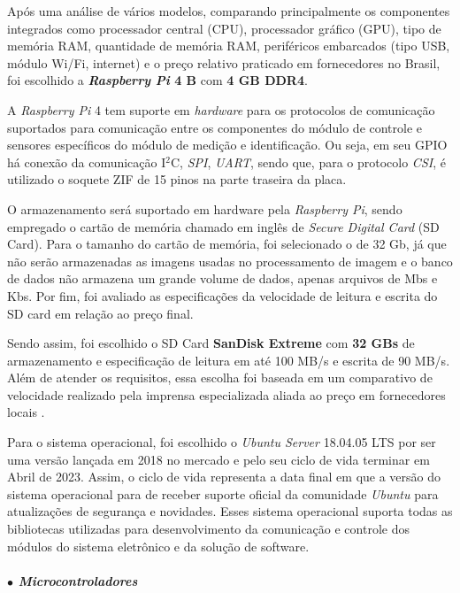    Após uma análise de vários modelos, comparando principalmente os componentes integrados como processador central (CPU), processador gráfico (GPU), tipo de memória RAM, quantidade de memória RAM, periféricos embarcados (tipo USB, módulo Wi/Fi, internet) e o preço relativo praticado em fornecedores no Brasil, foi escolhido a \textbf{\textit{Raspberry Pi }4 B} com \textbf{4 GB DDR4}. 
    
    A \textit{Raspberry Pi} 4 tem suporte em \textit{hardware} para os protocolos de comunicação suportados para comunicação entre os componentes do módulo de controle e sensores específicos do módulo de medição e identificação. Ou seja, em seu GPIO há conexão da comunicação I$^2$C, \textit{SPI}, \textit{UART}, sendo que, para o protocolo \textit{CSI}, é utilizado o soquete ZIF de 15 pinos na parte traseira da placa. 
    
    O armazenamento será suportado em hardware pela \textit{Raspberry Pi}, sendo empregado o cartão de memória chamado em inglês de \textit{Secure Digital Card} (SD Card). Para o tamanho do cartão de memória, foi selecionado o de 32 Gb, já que não serão  armazenadas as imagens usadas no processamento de imagem e o banco de dados não armazena um grande volume de dados, apenas arquivos de Mbs e Kbs. Por fim, foi avaliado as especificações da velocidade de leitura e escrita do SD card em relação ao preço final. 
    
    Sendo assim, foi escolhido o SD Card \textbf{SanDisk Extreme} com \textbf{32 GBs} de armazenamento e especificação de leitura em até 100 MB/s e escrita de 90 MB/s. Além de atender os requisitos, essa escolha foi baseada em um comparativo de velocidade realizado pela imprensa especializada aliada ao preço em fornecedores locais \cite{sdcard_benchmark}. 
    
    Para o sistema operacional, foi escolhido o \textit{Ubuntu Server} 18.04.05 LTS por ser uma versão lançada em 2018 no mercado e pelo seu ciclo de vida terminar em Abril de 2023. Assim, o ciclo de vida representa a data final em que a versão do sistema operacional para de receber suporte oficial da comunidade \textit{Ubuntu} para atualizações de segurança e novidades. Esses sistema operacional suporta todas as bibliotecas utilizadas para desenvolvimento da comunicação e controle dos módulos do sistema eletrônico e da solução de software.
    
    \newpage 
    
    \subparagraph*{$\bullet$ Microcontroladores} \hfill
    
